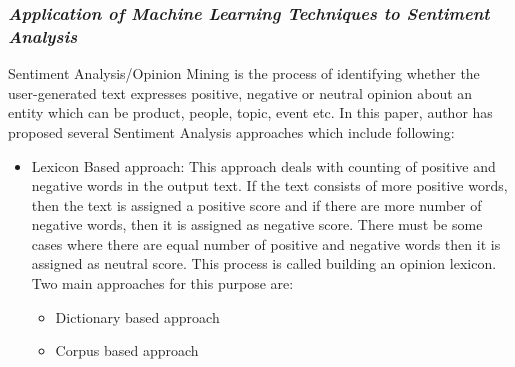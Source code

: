 \documentclass[conference]{IEEEtran}
\begin{document}
{\subsubsection{\textit{Application of Machine Learning Techniques to Sentiment Analysis\cite{b9}}}
Sentiment Analysis/Opinion Mining is the process of identifying whether the user-generated text expresses positive, negative or neutral opinion about an entity which can be product, people, topic, event etc.
In this paper, author has proposed several Sentiment Analysis approaches which include following:
\begin{itemize}
	\item Lexicon Based approach: This approach deals with counting of positive and negative words in the output text. If the text consists of more positive words, then the text is assigned a positive score and if there are more number of negative words, then it is assigned as negative score. There must be some cases where there are equal number of positive and negative words then it is assigned as neutral score. This process is called building an opinion lexicon. Two main approaches for this purpose are:
	\begin{itemize}
		\item Dictionary based approach
		\item Corpus based approach
		

\end{itemize}
\end{itemize}}
\end{document}
